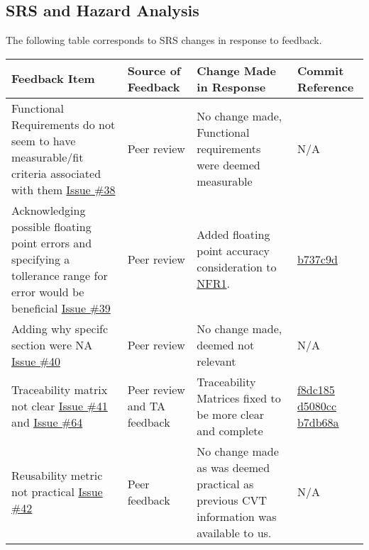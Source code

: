 \documentclass{article}
\begin{document}

\subsection{SRS and Hazard Analysis}

The following table corresponds to SRS changes in response to feedback.

    \begin{longtable}{|p{4cm}|p{1.5cm}|p{4cm}|p{1.5cm}|}
    \hline
    \textbf{Feedback Item} & \textbf{Source of Feedback} & \textbf{Change Made in Response} & \textbf{Commit Reference} \\
    \hline
    \endfirsthead
    \hline
    \endhead
    \hline
    \endfoot
    \hline
    \endlastfoot
    Functional Requirements do not seem to have measurable/fit criteria associated with them \href{https://github.com/gr812b/CVT-Simulator/issues/38}{Issue \#38} & Peer review  & No change made, Functional requirements were deemed measurable & N/A \\
    \hline 
    Acknowledging possible floating point errors and specifying a tollerance range for error would be beneficial \href{https://github.com/gr812b/CVT-Simulator/issues/39}{Issue \#39} & Peer review  & Added floating point accuracy consideration to \href{https://github.com/gr812b/CVT-Simulator/blob/main/docs/SRS/SRS.pdf}{NFR1}. 
    & \href{https://github.com/gr812b/CVT-Simulator/commit/b737c9dca12893fff6071cc0cf9fcc4c4b4d7a93}{b737c9d} \\
   
    \hline 
    Adding why specifc section were NA \href{https://github.com/gr812b/CVT-Simulator/issues/40}{Issue \#40} & Peer review & No change made, deemed not relevant & N/A\\
    \hline
    Traceability matrix not clear \href{https://github.com/gr812b/CVT-Simulator/issues/41}{Issue \#41} and \href{https://github.com/gr812b/CVT-Simulator/issues/64}{Issue \#64} & Peer review and TA feedback & Traceability Matrices fixed to be more clear and complete 
    & \href{https://github.com/gr812b/CVT-Simulator/commit/f8dc185e533e52c5260595c5b1c8d48bb4db3ff8}{f8dc185}  
    \href{https://github.com/gr812b/CVT-Simulator/commit/d5080cc95e629483f81ea46df03fbcc2f9c454eb}{d5080cc}  
    \href{https://github.com/gr812b/CVT-Simulator/commit/b7db68a977e81676ac26ccea8c662e55feb7d087}{b7db68a} 
    \\
    \hline
    Reusability metric not practical \href{https://github.com/gr812b/CVT-Simulator/issues/42}{Issue \#42} & Peer feedback & No change made as was deemed practical as previous CVT information was available to us. & N/A\\


\end{longtable}
\end{document}

